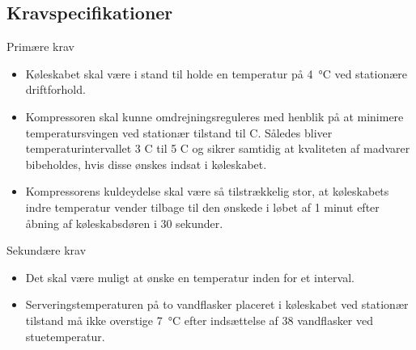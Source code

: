 \documentclass[../Hovedrapport.tex]{subfiles}
\begin{document}
\subsection*{Kravspecifikationer}
\label{sec:kravspec}
Primære krav
\begin{itemize}
    \item Køleskabet skal være i stand til holde en temperatur på \SI{4}{\celsius} ved stationære driftforhold.
    \item Kompressoren skal kunne omdrejningsreguleres med henblik på at minimere temperatursvingen ved stationær tilstand til \textdegree C. Således bliver temperaturintervallet 3 \textdegree C til 5 \textdegree C og sikrer samtidig at kvaliteten af madvarer bibeholdes, hvis disse ønskes indsat i køleskabet.  
    \item Kompressorens kuldeydelse skal være så tilstrækkelig stor, at køleskabets indre temperatur vender tilbage til den ønskede i løbet af 1 minut efter åbning af køleskabsdøren i 30 sekunder.
\end{itemize}
Sekundære krav
\begin{itemize}
    \item Det skal være muligt at ønske en temperatur inden for et interval.
    \item Serveringstemperaturen på to vandflasker placeret i køleskabet ved stationær tilstand må ikke overstige \SI{7}{\celsius} efter indsættelse af 38 vandflasker ved stuetemperatur. 
\end{itemize}
\end{document}
